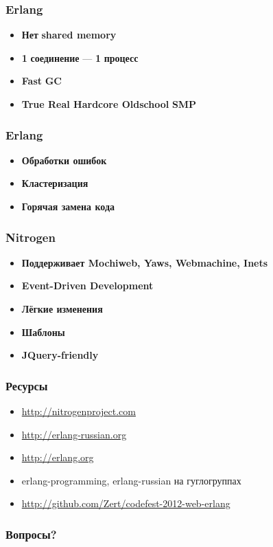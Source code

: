\documentclass[14pt]{beamer}
\begin{document}
\begin{frame}
  \frametitle{Erlang}
  \begin{itemize}
  \item \textbf{\color{darkgray}Нет} \textbf{\color{magenta}shared memory}
  \item \textbf{\color{darkgray}1} \textbf{\color{magenta}соединение} — \textbf{\color{darkgray}1} \textbf{\color{magenta}процесс}
  \item \textbf{\color{darkgray}Fast} \textbf{\color{magenta}GC}
  \item \textbf{\color{darkgray}True Real Hardcore Oldschool} \textbf{\color{magenta}SMP}
  \end{itemize}
\end{frame}


\begin{frame}
  \frametitle{Erlang}
  \begin{itemize}
  \item \textbf{\color{darkgray}Обработки ошибок}
  \item \textbf{\color{darkgray}Кластеризация}
  \item \textbf{\color{darkgray}Горячая замена кода}
  \end{itemize}
\end{frame}


\begin{frame}
  \frametitle{Nitrogen}
  \begin{itemize}
  \item \textbf{\color{darkgray}Поддерживает Mochiweb, Yaws, Webmachine, Inets}
  \item \textbf{\color{darkgray}Event-Driven Development}
  \item \textbf{\color{darkgray}Лёгкие изменения} %
  \item \textbf{\color{darkgray}Шаблоны}
  \item \textbf{\color{darkgray}JQuery-friendly}
  \end{itemize}
\end{frame}


\begin{frame}
  \frametitle{Ресурсы}
  \begin{itemize}
  \item {\color{blue}\url{http://nitrogenproject.com}}
  \item {\color{blue}\url{http://erlang-russian.org}}
  \item {\color{blue}\url{http://erlang.org}}
  \item erlang-programming, erlang-russian на гуглогруппах
  \item {\color{blue}\url{http://github.com/Zert/codefest-2012-web-erlang}}
  \end{itemize}
\end{frame}


\begin{frame}
  \frametitle{Вопросы?}
  \titlepage
\end{frame}
\end{document}
